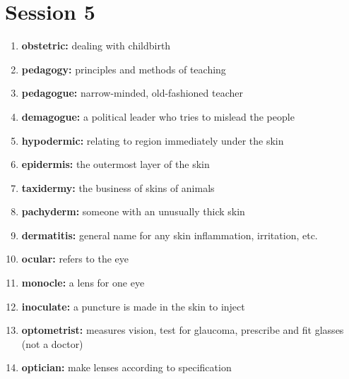 \documentclass{article}
\begin{document}
\section{Session 5}
\begin{enumerate}
    \item \textbf{obstetric: }{dealing with childbirth}
    \item \textbf{pedagogy: }{principles and methods of teaching}
    \item \textbf{pedagogue: }{narrow-minded, old-fashioned teacher}
    \item \textbf{demagogue: }{a political leader who tries to mislead the people}
    \item \textbf{hypodermic: }{relating to region immediately under the skin}
    \item \textbf{epidermis: }{the outermost layer of the skin}
    \item \textbf{taxidermy: }{the business of skins of animals}
    \item \textbf{pachyderm: }{someone with an unusually thick skin}
    \item \textbf{dermatitis: }{general name for any skin inflammation, irritation, etc.}
    \item \textbf{ocular: }{refers to the eye}
    \item \textbf{monocle: }{a lens for one eye}
    \item \textbf{inoculate: }{a puncture is made in the skin to inject}
    \item \textbf{optometrist: }{measures vision, test for glaucoma, prescribe and fit glasses (not a doctor)}
    \item \textbf{optician: }{make lenses according to specification}
    
\end{enumerate}
\end{document}
